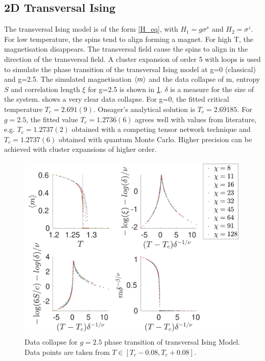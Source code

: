 \documentclass[twocolumn]{article}
\newcounter{a}
\newcounter{b}
\begin{document}
\subsection{2D Transversal Ising}
The transversal Ising model is of the form \cref{H_eq}, with $H_1=g  \sigma ^x$ and $H_2= \sigma^z$. For low temperature, the spins tend to align forming a magnet. For high T, the magnetisation disappears. The transversal field cause the spins to align in the direction of the transversal field. A cluster expansion of order 5 with loops is used to simulate the phase transition of the transversal Ising model at g=0 (classical) and g=2.5. The simulated magnetisation $ \braket{m}$ and the data collapse of m, entropy $S$ and correlation length $\xi$ for g=2.5 is shown in \cref{fig:phase:g25:zoomed}. $\delta$ is a measure for the size of the system.  shows a very clear data collapse. For g=0, the fitted critical temperature $T_c = 2.691(9)$. Onsager's analytical solution is $T_c = 2.69185$. For $g=2.5$, the fitted value $T_c=1.2736(6)$ agrees well with values from literature, e.g. $T_c=1.2737(2)$ obtained with a competing tensor network technique and $T_c=1.2737(6)$ obtained with quantum Monte Carlo. \cite{Czarnik2019} Higher precision can be achieved with cluster expansions of higher order.

\begin{figure}[h!]
    \center
    \includegraphics[width=\linewidth]{../Figuren/phasediag/g25/zoomed_small.pdf}
    \caption{ Data collapse for $g=2.5$ phase transition of transversal Ising Model. Data points are taken from $T \in \left[ T_c -0.08, T_c +0.08 \right]$. }
    \label{fig:phase:g25:zoomed}
\end{figure}
\end{document}
